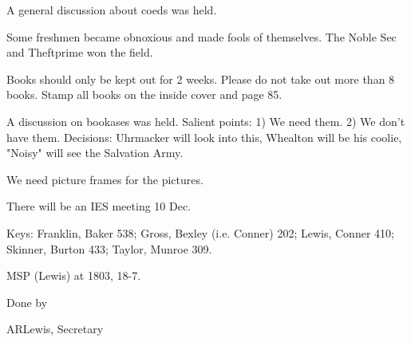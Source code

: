 \documentclass[12pt]{article}
\begin{document}
A general discussion about coeds was held.

Some freshmen became obnoxious and made fools of themselves. The Noble Sec and Theftprime won the field.

Books should only be kept out for 2 weeks. Please do not take out more than 8 books. Stamp all books on the inside cover and page 85.

A discussion on bookases was held. Salient points: 1) We need them. 2) We don't have them. Decisions: Uhrmacker will look into this, Whealton will be his coolie, "Noisy" will see the Salvation Army.

We need picture frames for the pictures.

There will be an IES meeting 10 Dec.

Keys: Franklin, Baker 538; Gross, Bexley (i.e. Conner) 202; Lewis, Conner 410; Skinner, Burton 433; Taylor, Munroe 309.

MSP (Lewis) at 1803, 18-7.

\vspace{12pt}

\centerline{Done by}
\centerline{ARLewis, Secretary}
\end{document}
